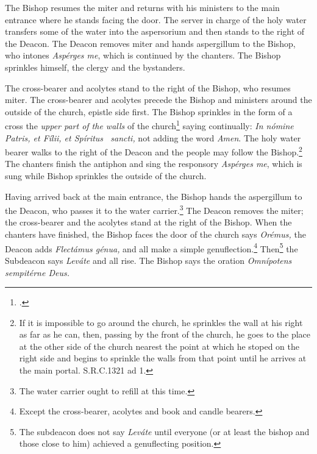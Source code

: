 \documentclass[letterpaper]{report}
\newcommand\src{\textsc{S.R.C.}}
\begin{document}
{    \rubric The Bishop resumes the miter and returns with his ministers to the
    main entrance where he stands facing the door. The server in charge of the
    holy water transfers some of the water into the aspersorium and then stands
    to the right of the Deacon. The Deacon removes miter and hands aspergillum
    to the Bishop, who intones \textit{Asp\'erges me}, which is continued by
    the chanters. The Bishop sprinkles himself, the clergy and the bystanders.

    \rubric The cross-bearer and acolytes stand to the right of the Bishop, who
    resumes miter. The cross-bearer and acolytes precede the Bishop and
    ministers around the outside of the church, epistle side first. The Bishop
    sprinkles in the form of a cross the \textit{upper part of the walls} of
    the church\footcite[The procession walks around and Bishop sprinkles the
    cemetery also if it be adjacent.][n. 41, p. 44.]{consecranda} saying
    continually: \textit{In nómine Pa\cross tris, et Fí\cross lii, et Spíritus
    \cross\ sancti,} not adding the word \textit{Amen}. The holy water bearer
    walks to the right of the Deacon and the people may follow the
    Bishop.\footnote{If it is impossible to go around the church, he sprinkles
    the wall at his right as far as he can, then, passing by the front of the
    church, he goes to the place at the other side of the church nearest the
    point at which he stoped on the right side and begins to sprinkle the walls
    from that point until he arrives at the main portal. \src 1321 ad 1.} The
    chanters finish the antiphon and sing the responsory \textit{Asp\'erges
    me}, which is sung while Bishop sprinkles the outside of the church.

    \rubric Having arrived back at the main entrance, the Bishop hands the
    aspergillum to the Deacon, who passes it to the water carrier.\footnote{The
    water carrier ought to refill at this time.} The Deacon removes the miter;
    the cross-bearer and the acolytes stand at the right of the Bishop. When
    the chanters have finished, the Bishop faces the door of the church says
    \textit{Orémus,} the Deacon adds \textit{Flectámus génua,} and all make a
    simple genuflection.\footnote{Except the cross-bearer, acolytes and book
    and candle bearers.} Then\footnote{The subdeacon does not say
    \textit{Leváte} until everyone (or at least the bishop and those close to
    him) achieved a genuflecting position.} the Subdeacon says \textit{Leváte}
    and all rise. The Bishop says the oration \textit{Omnípotens sempitérne
    Deus.}

}
\end{document}
